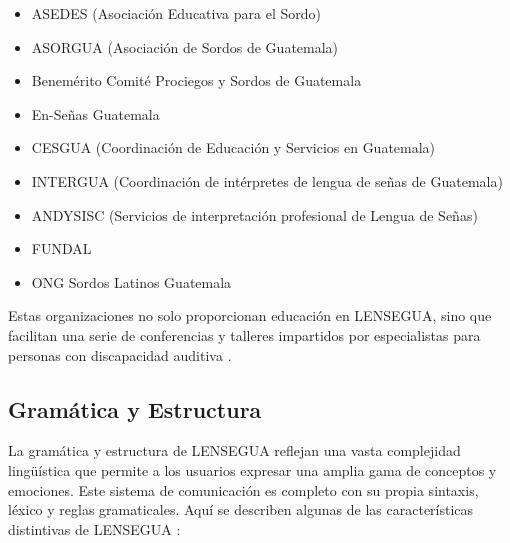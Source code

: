 \begin{itemize}
    \item ASEDES (Asociación Educativa para el Sordo)
    \item ASORGUA (Asociación de Sordos de Guatemala)
    \item Benemérito Comité Prociegos y Sordos de Guatemala
    \item En-Señas Guatemala
    \item CESGUA (Coordinación de Educación y Servicios en Guatemala)
    \item INTERGUA (Coordinación de intérpretes de lengua de señas de Guatemala)
    \item ANDYSISC (Servicios de interpretación profesional de Lengua de Señas)
    \item FUNDAL
    \item ONG Sordos Latinos Guatemala
\end{itemize}

Estas organizaciones no solo proporcionan educación en LENSEGUA, sino que facilitan una serie de conferencias y talleres impartidos por especialistas para personas con discapacidad auditiva \cite{LenseguaSF}.

\subsection{Gramática y Estructura}
La gramática y estructura de LENSEGUA reflejan una vasta complejidad lingüística que permite a los usuarios expresar una amplia gama de conceptos y emociones. Este sistema de comunicación es completo con su propia sintaxis, léxico y reglas gramaticales. Aquí se describen algunas de las características distintivas de LENSEGUA \cite{EnSenasCultura}  \cite{EnSenasGramatica} \cite{EnSenasTecnicas}  :


